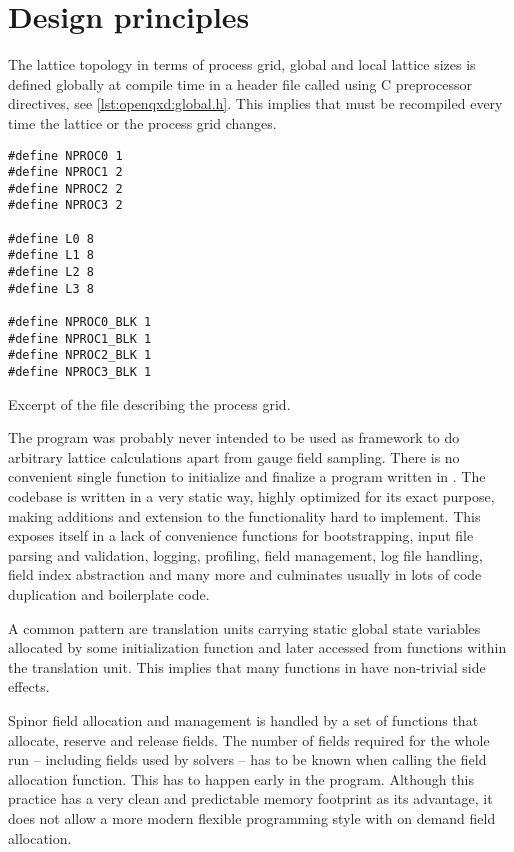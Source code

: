 \section{Design principles}

The lattice topology in terms of process grid, global and local lattice sizes is defined globally at compile time in a header file called  using C preprocessor directives, see \cref{lst:openqxd:global.h}. This implies that \openqxd must be recompiled every time the lattice or the process grid changes.
\begin{codelisting}
\begin{verbatim}
#define NPROC0 1
#define NPROC1 2
#define NPROC2 2
#define NPROC3 2

#define L0 8
#define L1 8
#define L2 8
#define L3 8

#define NPROC0_BLK 1
#define NPROC1_BLK 1
#define NPROC2_BLK 1
#define NPROC3_BLK 1
\end{verbatim}
\caption{Excerpt of the file  describing the \openqxd process grid.}
\label{lst:openqxd:global.h}
\end{codelisting}

The program was probably never intended to be used as framework to do arbitrary lattice calculations apart from gauge field sampling. There is no convenient single function to initialize and finalize a program written in \openqxd. The codebase is written in a very static way, highly optimized for its exact purpose, making additions and extension to the functionality hard to implement. This exposes itself in a lack of convenience functions for bootstrapping, input file parsing and validation, logging, profiling, field management, log file handling, field index abstraction and many more and culminates usually in lots of code duplication and boilerplate code.

A common pattern are translation units carrying static global state variables allocated by some initialization function and later accessed from functions within the translation unit. This implies that many functions in \openqxd have non-trivial side effects.%

Spinor field allocation and management is handled by a set of functions that allocate, reserve and release fields. The number of fields required for the whole run -- including fields used by solvers -- has to be known when calling the field allocation function. This has to happen early in the program. Although this practice has a very clean and predictable memory footprint as its advantage, it does not allow a more modern flexible programming style with on demand field allocation.

